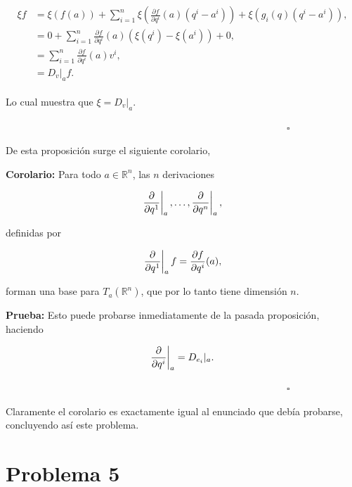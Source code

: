 \documentclass[a4paper,10pt]{article}
\numberwithin{equation}{section}
\newcommand{\zerodel}{.\kern-\nulldelimiterspace}
\newcommand{\prueba}{\textbf{Prueba: }}
\newcommand{\corolario}{\textbf{Corolario: }}
\begin{document}
\begin{align}
 \begin{split}
  \xi f &= \xi(f(a)) + \sum_{i=1}^n \xi \left( \frac{\partial f}{\partial q^i}(a) (q^i - a^i)\right) 
  + \xi (g_i(q) (q^i - a^i)), \\
	&= 0 + \sum_{i=1}^n \frac{\partial f}{\partial q^i}(a)(\xi(q^i)- \xi(a^i)) + 0, \\
	&= \sum_{i=1}^n \frac{\partial f}{\partial q^i}(a)v^i, \\
	&= D_v|_a f.
 \end{split}
\end{align}

Lo cual muestra que $\xi = D_v|_a$.

$\hspace{12cm} \square$

De esta proposición surge el siguiente corolario, 

\vspace{.3cm}

\corolario Para todo $a \in \mathbb{R}^n$, las $n$ derivaciones 

\begin{equation}
 \left\zerodel\frac{\partial}{\partial q^1}\right|_a, \dots, 
  \left\zerodel\frac{\partial}{\partial q^n}\right|_a,
\end{equation}

definidas por 

\begin{equation}
  \left\zerodel\frac{\partial}{\partial q^1}\right|_a f = 
  \frac{\partial f}{\partial q^i}(a),
\end{equation}

forman una base para $T_a(\mathbb{R}^n)$, que por lo tanto tiene 
dimensión $n$.

\vspace{.3cm}

\prueba Esto puede probarse inmediatamente de la pasada proposición, 
haciendo 

\begin{equation}
 \left\zerodel\frac{\partial}{\partial q^i}\right|_a = D_{e_{i}}|_a. 
\end{equation}

$\hspace{12cm} \square$

Claramente el corolario es exactamente igual al enunciado que debía 
probarse, concluyendo así este problema.

\section{Problema 5}
\end{document}
